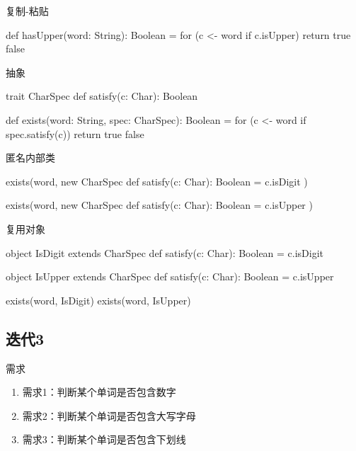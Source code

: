 \begin{frame}[fragile]{复制-粘贴}
  \begin{scala}
def hasUpper(word: String): Boolean = {
  for (c <- word if c.isUpper)
    return true
  false
}
  \end{scala}
\end{frame}

\begin{frame}[fragile]{抽象}
  \begin{scala}
trait CharSpec {
  def satisfy(c: Char): Boolean
}

def exists(word: String, spec: CharSpec): Boolean = {
  for (c <- word if spec.satisfy(c))
    return true
  false
}
  \end{scala}
\end{frame}

\begin{frame}[fragile]{匿名内部类}
  \begin{scala}
exists(word, new CharSpec {
  def satisfy(c: Char): Boolean = c.isDigit
})

exists(word, new CharSpec {
  def satisfy(c: Char): Boolean = c.isUpper
})
  \end{scala}
\end{frame}

\begin{frame}[fragile]{复用对象}
  \begin{scala}
object IsDigit extends CharSpec {
  def satisfy(c: Char): Boolean = c.isDigit
}

object IsUpper extends CharSpec {
  def satisfy(c: Char): Boolean = c.isUpper
}

exists(word, IsDigit)
exists(word, IsUpper)
  \end{scala}
\end{frame}

\subsection{迭代3}

\begin{frame}{需求}
  \begin{block}{}
    \begin{enumerate}
    \item \alert{需求1}：判断某个单词是否包含数字
    \item \alert{需求2}：判断某个单词是否包含大写字母
    \item \alert{需求3}：判断某个单词是否包含下划线 
    \end{enumerate}
  \end{block}
\end{frame}

